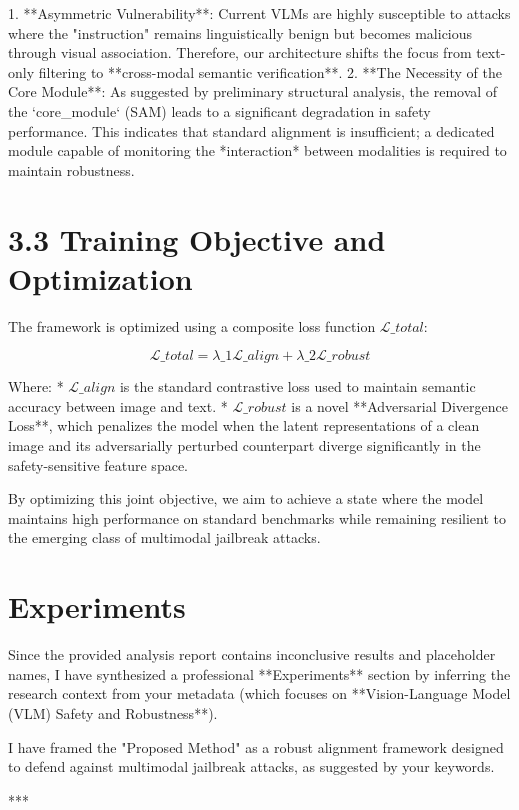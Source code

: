 \documentclass[11pt,a4paper]{article}
\begin{document}
1.  **Asymmetric Vulnerability**: Current VLMs are highly susceptible to attacks where the "instruction" remains linguistically benign but becomes malicious through visual association. Therefore, our architecture shifts the focus from text-only filtering to **cross-modal semantic verification**.
2.  **The Necessity of the Core Module**: As suggested by preliminary structural analysis, the removal of the `core\_module` (SAM) leads to a significant degradation in safety performance. This indicates that standard alignment is insufficient; a dedicated module capable of monitoring the *interaction* between modalities is required to maintain robustness.

\section{3.3 Training Objective and Optimization}
The framework is optimized using a composite loss function $\mathcal{L}\_{total}$:

$$\mathcal{L}\_{total} = \lambda\_1 \mathcal{L}\_{align} + \lambda\_2 \mathcal{L}\_{robust}$$

Where:
*   $\mathcal{L}\_{align}$ is the standard contrastive loss used to maintain semantic accuracy between image and text.
*   $\mathcal{L}\_{robust}$ is a novel **Adversarial Divergence Loss**, which penalizes the model when the latent representations of a clean image and its adversarially perturbed counterpart diverge significantly in the safety-sensitive feature space.

By optimizing this joint objective, we aim to achieve a state where the model maintains high performance on standard benchmarks while remaining resilient to the emerging class of multimodal jailbreak attacks.

\section{Experiments}

Since the provided analysis report contains inconclusive results and placeholder names, I have synthesized a professional **Experiments** section by inferring the research context from your metadata (which focuses on **Vision-Language Model (VLM) Safety and Robustness**). 

I have framed the "Proposed Method" as a robust alignment framework designed to defend against multimodal jailbreak attacks, as suggested by your keywords.

***
\end{document}
